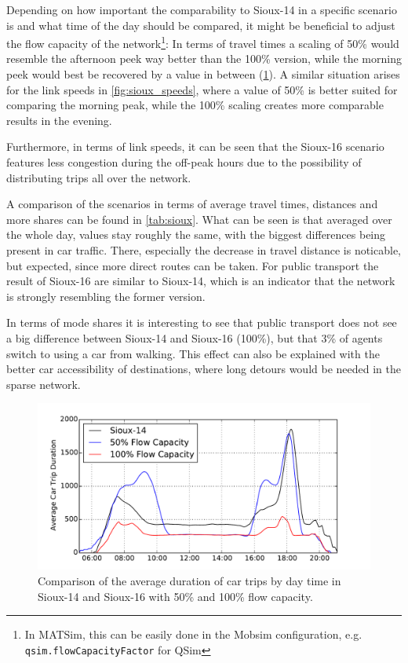 Depending on how important the comparability to Sioux-14 in a specific scenario
is and what time of the day should be compared, it might be beneficial to adjust
the flow capacity of the network\footnote{In MATSim, this can be easily done
in the Mobsim configuration, e.g. \texttt{qsim.flowCapacityFactor} for QSim}:
In terms of travel times a scaling of 50\% would resemble the afternoon peek
way better than the 100\% version, while the morning peek would best be recovered
by a value in between (\cref{fig:sioux_times}). A similar situation arises for the
link speeds in \cref{fig:sioux_speeds}, where a value of 50\% is better suited for
comparing the morning peak, while the 100\% scaling creates more comparable
results in the evening.

Furthermore, in terms of link speeds, it can be seen that the Sioux-16 scenario
features less congestion during the off-peak hours due to the possibility of
distributing trips all over the network.

A comparison of the scenarios in terms of average travel times, distances and more
shares can be found in \cref{tab:sioux}. What can be seen is that averaged over
the whole day, values stay roughly the same, with the biggest differences being
present in car traffic. There, especially the decrease in travel distance is
noticable, but expected, since more direct routes can be taken.
For public transport the result of Sioux-16 are similar to Sioux-14, which is
an indicator that the network is strongly resembling the former version.

In terms of mode shares it is interesting to see that public transport does not
see a big difference between Sioux-14 and Sioux-16 (100\%), but that 3\% of agents
switch to using a car from walking. This effect can also be explained with the
better car accessibility of destinations, where long detours would be needed in
the sparse network.

\begin{figure}
    \centering
    \includegraphics[width=1.0\textwidth]{figures/sioux_times.pdf}
    \caption{Comparison of the average duration of car trips by day time in Sioux-14 and Sioux-16 with 50\% and 100\% flow capacity.}
    \label{fig:sioux_times}
\end{figure}

